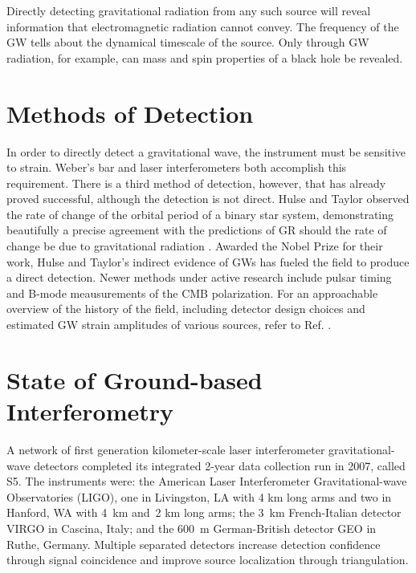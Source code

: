 Directly detecting gravitational radiation from any such source will
reveal information that electromagnetic radiation cannot convey. The
frequency of the GW tells about the dynamical timescale of the
source. Only through GW radiation, for example, can mass and spin
properties of a black hole be revealed.





\section{Methods of Detection}
In order to directly detect a gravitational wave, the instrument must
be sensitive to strain. Weber's bar and laser interferometers both
accomplish this requirement. There is a third method of detection,
however, that has already proved successful, although the detection is
not direct. Hulse and Taylor observed the rate of change of the
orbital period of a binary star system, demonstrating beautifully a
precise agreement with the predictions of GR should the rate of change
be due to gravitational radiation \cite{Hulse1975Discovery}
\cite{Weisberg2005Relativistic}. Awarded the Nobel Prize for their
work, Hulse and Taylor's indirect evidence of GWs has fueled the field
to produce a direct detection. Newer methods under active research
include pulsar timing \cite{Hobbs2009International} and B-mode
meausurements of the CMB polarization. For an approachable overview of
the history of the field, including detector design choices and
estimated GW strain amplitudes of various sources, refer to
Ref. \cite{Linsay1983Study}.






\section{State of Ground-based Interferometry}
A network of first generation kilometer-scale laser interferometer
gravitational-wave detectors completed its integrated 2-year data
collection run in 2007, called S5. The instruments were: the American
Laser Interferometer Gravitational-wave Observatories (LIGO)\cite{Abbott2009LIGO},
one in Livingston, LA with 4 km long arms and two in Hanford, WA with
4~km and~2 km long arms; the 3~km French-Italian detector
VIRGO\cite{Acernese2008Virgo} in Cascina, Italy; and the 600~m
German-British detector GEO\cite{Luck2006Status} in Ruthe, Germany. Multiple
separated detectors increase detection confidence through signal
coincidence and improve source localization through triangulation.

